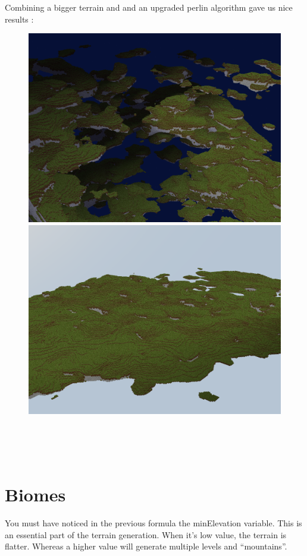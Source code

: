 \documentclass[article]{report}             %
\begin{document}
				Combining a bigger terrain and and an upgraded perlin algorithm gave us nice results : 
				
				\begin{figure}[h]
					\includegraphics[scale=0.25]{images/terrain01.png}
					\includegraphics[scale=0.25]{images/terrain02.png}
				\end{figure}

				~\\~\\ ~\\
			\section{Biomes}
				You must have noticed in the previous formula the minElevation variable. This is an essential part of the terrain generation. When it's low value, the terrain is flatter. Whereas a higher value will generate multiple levels and \enquote{mountains}. \\
\end{document}
